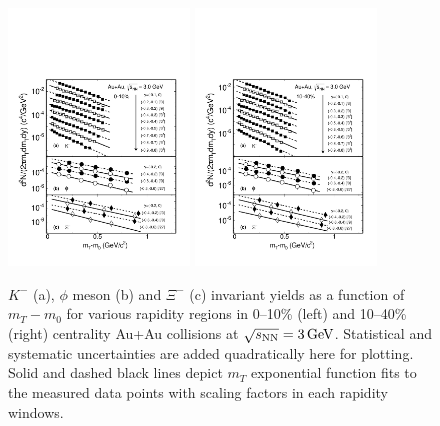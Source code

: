 \documentclass[aps,tightenlines,superscriptaddress,twocolumn]{revtex4-1}
\begin{document}
\begin{figure}
\centering
\hspace*{-10mm}
\includegraphics[width=0.43\textwidth]{fig21-eps-converted-to.pdf}
\hspace*{+10mm}
\includegraphics[width=0.43\textwidth]{fig22-eps-converted-to.pdf}
\caption{$K^-$ (a), $\phi$ meson (b) and $\Xi^-$ (c) invariant yields as a function of $m_T-m_0$ for various rapidity regions in 0--10\% (left) and  10--40\% (right) centrality Au+Au collisions at ${\sqrt{s_{\rm NN}} = \rm{3\,GeV}}$. Statistical and systematic uncertainties are added quadratically here for plotting. Solid and dashed black lines depict $m_T$ exponential function fits to the measured data points with scaling factors in each rapidity windows.}
\label{fig:phimTSpectra21}
\end{figure}
\end{document}
